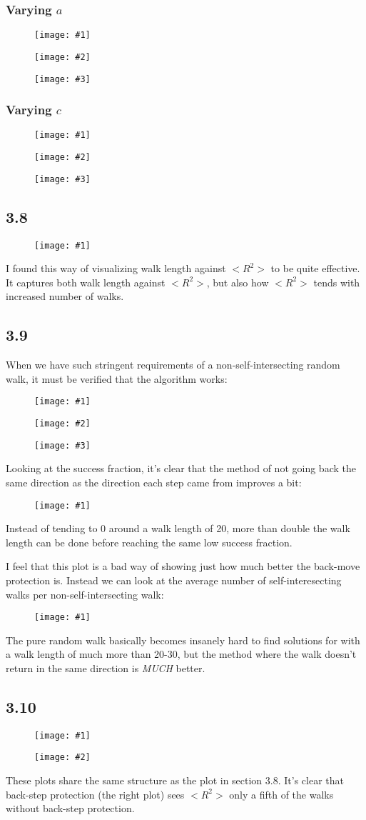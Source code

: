 \documentclass[11pt]{article}
\newcommand{\triplefigure}[3]{
\begin{figure}[H]
  \centering
  \begin{minipage}{0.3\textwidth}
    \centering
    \texttt{[image: \#1]}
  \end{minipage}
  \begin{minipage}{0.3\textwidth}
    \centering
    \texttt{[image: \#2]}
  \end{minipage}
  \begin{minipage}{0.3\textwidth}
    \centering
    \texttt{[image: \#3]}
  \end{minipage}
\end{figure}
}
\newcommand{\doublefigure}[2]{
\begin{figure}[H]
  \centering
  \begin{minipage}{0.45\textwidth}
    \centering
    \texttt{[image: \#1]}
  \end{minipage}
  \begin{minipage}{0.45\textwidth}
    \centering
    \texttt{[image: \#2]}
  \end{minipage}
\end{figure}
}
\newcommand{\singlefigure}[1]{
\begin{figure}[H]
  \centering
  \begin{minipage}{0.4\textwidth}
    \centering
    \texttt{[image: \#1]}
  \end{minipage}
\end{figure}
}
\newcommand{\singlewiderfigure}[1]{
\begin{figure}[H]
  \centering
  \begin{minipage}{0.65\textwidth}
    \centering
    \texttt{[image: \#1]}
  \end{minipage}
\end{figure}
}
\begin{document}
\subsubsection*{Varying $a$}
\triplefigure{./plots/3_7/randomwalk_1000_r1_a4_c4_m128.png}{./plots/3_7/randomwalk_1000_r1_a5_c4_m128.png}{./plots/3_7/randomwalk_1000_r1_a6_c4_m128.png}
\subsubsection*{Varying $c$}
\triplefigure{./plots/3_7/randomwalk_1000_r1_a3_c5_m128.png}{./plots/3_7/randomwalk_1000_r1_a3_c6_m128.png}{./plots/3_7/randomwalk_1000_r1_a3_c7_m128.png}

\subsection*{3.8}
\singlewiderfigure{./plots/3_8/walklen.png}

I found this way of visualizing walk length against $<R^2>$ to be quite effective. 
It captures both walk length against $<R^2>$, but also how $<R^2>$ tends with increased number of walks.

\subsection*{3.9}
When we have such stringent requirements of a non-self-intersecting random walk, it must be verified that the algorithm works:
\triplefigure{./plots/3_9/randomwalk_15.png}{./plots/3_9/randomwalk_25.png}{./plots/3_9/randomwalk_50.png}

Looking at the success fraction, it's clear that the method of not going back the same direction as the direction each step came from improves a bit:
\singlefigure{./plots/3_9/success_fraction.png}
Instead of tending to 0 around a walk length of 20, more than double the walk length can be done before reaching the same low success fraction.

I feel that this plot is a bad way of showing just how much better the back-move protection is. Instead we can look at the average number of self-interesecting walks per non-self-intersecting walk:
\singlefigure{./plots/3_9/per_success.png}

The pure random walk basically becomes insanely hard to find solutions for with a walk length of much more than 20-30, but the method where the walk doesn't return in the same direction is \textit{MUCH} better.

\subsection*{3.10}
\doublefigure{./plots/3_10/walklen_with.png}{./plots/3_10/walklen_without.png}
These plots share the same structure as the plot in section 3.8. It's clear that back-step protection (the right plot) sees $<R^2>$ only a fifth of the walks without back-step protection.
\end{document}
